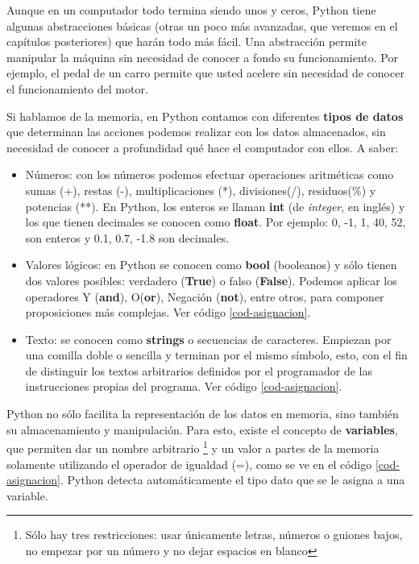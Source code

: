 Aunque en un computador todo termina siendo unos y ceros, Python tiene algunas abstracciones básicas (otras un poco más avanzadas, que veremos en el capítulos posteriores) que harán todo más fácil. Una abstracción permite manipular la máquina sin necesidad de conocer a fondo su funcionamiento. Por ejemplo, el pedal de un carro permite que usted acelere sin necesidad de conocer el funcionamiento del motor. 

Si hablamos de la memoria, en Python contamos con diferentes \textbf{tipos de datos} que determinan las acciones podemos realizar con los datos almacenados, sin necesidad de conocer a profundidad qué hace el computador con ellos. A saber:

\begin{itemize}
\item Números: con los números podemos efectuar operaciones aritméticas como sumas (+), restas (-), multiplicaciones (*), divisiones(/), residuos(\%) y potencias (**). En Python, los enteros se llaman \textbf{int} (de \emph{integer}, en inglés) y los que tienen decimales se conocen como \textbf{float}. Por ejemplo: 0, -1, 1, 40, 52, son enteros y 0.1, 0.7, -1.8 son decimales.

\item Valores lógicos: en Python se conocen como \textbf{bool} (booleanos) y sólo tienen dos valores posibles: verdadero (\textbf{True}) o falso (\textbf{False}). Podemos aplicar los operadores Y (\textbf{and}), O(\textbf{or}), Negación (\textbf{not}), entre otros, para componer proposiciones más complejas.  Ver código \ref{cod-asignacion}.

\item Texto: se conocen como \textbf{strings} o secuencias de caracteres. Empiezan por una comilla doble o sencilla y terminan por el mismo símbolo, esto, con el fin de distinguir los textos arbitrarios definidos por el programador de las instrucciones propias del programa. Ver código \ref{cod-asignacion}.
\end{itemize}

Python no sólo facilita la representación de los datos en memoria, sino también su almacenamiento y manipulación. Para esto, existe el concepto de \textbf{variables}, que permiten dar un nombre arbitrario \footnote{Sólo hay tres restricciones: usar únicamente letras, números o guiones bajos, no empezar por un número y no dejar espacios en blanco} y un valor a partes de la memoria solamente utilizando el operador de igualdad (=), como se ve en el código \ref{cod-asignacion}. Python detecta automáticamente el tipo dato que se le asigna a una variable. \\

